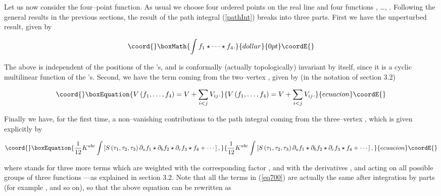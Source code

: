 \documentclass[a4paper,11pt]{article}
\begin{document}
Let us now consider the four--point function. As usual we choose four
ordered points \coordHE{} on the real line and four
functions \coordHE{}, \dots, \coordHE{}. Following the general results in the
previous sections, the result of the path integral (\ref{pathInt}) breaks
into three parts. First we have the unperturbed result, given by

$$\coord{}\boxMath{
\int f_{1} \star \cdots \star f_{4}.
}{dollar}{0pt}\coordE{}$$

\noindent
The above is independent of the positions of the \myHighlight{$\tau $}\coordHE{}'s, and is
conformally (actually topologically) invariant by itself, since it is a
cyclic multilinear function of the \coordHE{}'s. Second, we have the term coming
from the two--vertex \coordHE{}, given by (in the notation of section 
3.2) 

\begin{equation}\coord{}\boxEquation{
V\left( f_{1}, \dots, f_{4}\right) =V+\sum_{i<j}V_{ij} . \label{eq800}
}{
V\left( f_{1}, \dots, f_{4}\right) =V+\sum_{i<j}V_{ij} . }{ecuacion}\coordE{}\end{equation}

\noindent
Finally we have, for the first time, a non--vanishing contributions to the
path integral coming from the three--vertex \coordHE{}, which is given
explicitly by

\begin{equation}\coord{}\boxEquation{
\frac{1}{12}K^{abc}\int \left[ S\left( \tau _{1},\tau _{2},\tau _{3}\right)
\partial _{a}f_{1}\star \partial _{b}f_{2}\star \partial _{c}f_{3}\star
f_{4}+\cdots \right] ,  \label{eq700}
}{
\frac{1}{12}K^{abc}\int \left[ S\left( \tau _{1},\tau _{2},\tau _{3}\right)
\partial _{a}f_{1}\star \partial _{b}f_{2}\star \partial _{c}f_{3}\star
f_{4}+\cdots \right] ,  }{ecuacion}\coordE{}\end{equation}

\noindent
where \myHighlight{$\cdots$}\coordHE{} stands for three more terms which are weighted with the
corresponding factor \coordHE{}, and
with the derivatives \coordHE{}, \coordHE{} and \coordHE{}
acting on all possible groups of three functions ---as explained in 
section 3.2. Note that all the terms in (\ref{eq700}) are actually the same 
after integration by parts (for example \coordHE{}, and so on), so that the above equation can be rewritten as 
\end{document}
